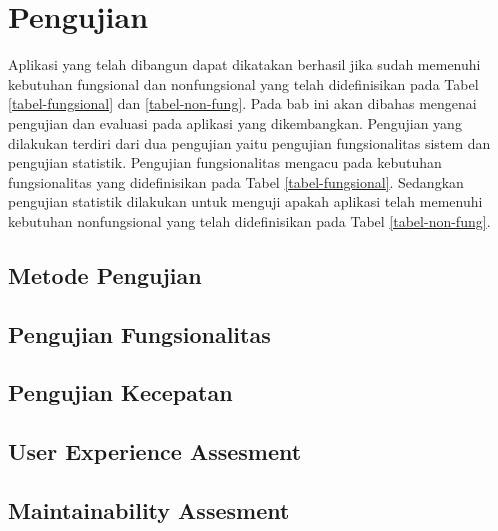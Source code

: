 \section{Pengujian}
	Aplikasi yang telah dibangun dapat dikatakan berhasil jika sudah memenuhi kebutuhan fungsional dan nonfungsional yang telah didefinisikan pada Tabel \ref{tabel-fungsional} dan \ref{tabel-non-fung}. Pada bab ini akan dibahas mengenai pengujian dan evaluasi pada aplikasi yang dikembangkan. Pengujian yang dilakukan terdiri dari dua pengujian yaitu pengujian fungsionalitas sistem dan pengujian statistik. Pengujian fungsionalitas mengacu pada kebutuhan fungsionalitas yang didefinisikan pada Tabel \ref{tabel-fungsional}. Sedangkan pengujian statistik dilakukan untuk menguji apakah aplikasi telah memenuhi kebutuhan nonfungsional yang telah didefinisikan pada Tabel \ref{tabel-non-fung}.

	
	\subsection{Metode Pengujian}
	
		
	\subsection{Pengujian Fungsionalitas}
	\label{uji-fungsional}
	
	
	\subsection{Pengujian Kecepatan}
	\label{uji-performa}
	
	
	\subsection{User Experience Assesment}
	\label{[uji-ux}
	
	
	\subsection{Maintainability Assesment}
	\label{uji-maintainability}
	
	
	
		
		
